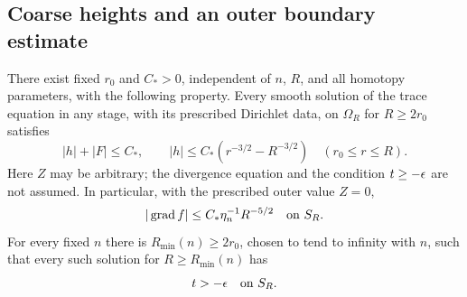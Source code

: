 \subsection{Coarse heights and an outer boundary estimate}

\begin{lemma}\label{four:lem:coarse-height}
There exist fixed $r_0$ and $C_*>0$, independent of $n$, $R$, and all
homotopy parameters, with the following property.  Every smooth solution
of the trace equation in any stage, with its prescribed Dirichlet data,
on $\Omega_R$ for $R\ge2r_0$ satisfies
\begin{equation}\label{four:sys:coarse-height}
 |h|+|F|\le C_*,\qquad
 |h|\le C_*(r^{-3/2}-R^{-3/2})\quad(r_0\le r\le R).
\end{equation}
Here $Z$ may be arbitrary; the divergence equation and the condition
$t\ge-\epsilon$ are not assumed.  In particular, with the prescribed outer
value $Z=0$,
\begin{equation}\label{four:sys:outer-gradient}
 |\operatorname{grad} f|\le C_*\eta_n^{-1}R^{-5/2}\quad\text{on }S_R.
\end{equation}
For every fixed $n$ there is $R_{\min}(n)\ge2r_0$, chosen to tend to
infinity with $n$, such that every such solution for $R\ge R_{\min}(n)$
has
\begin{equation}\label{four:sys:outer-floor}
 t> -\epsilon\quad\text{on }S_R.
\end{equation}
\end{lemma}

